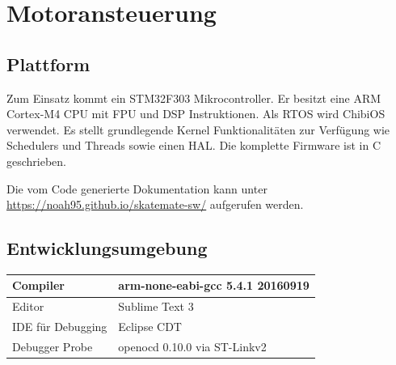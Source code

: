 \section{Motoransteuerung} \label{SW_Motoransteuerung}
\subsection*{Plattform}
Zum Einsatz kommt ein STM32F303 Mikrocontroller. Er besitzt eine ARM Cortex-M4 CPU mit FPU und DSP Instruktionen. Als RTOS wird ChibiOS verwendet. Es stellt grundlegende Kernel Funktionalitäten zur Verfügung wie Schedulers und Threads sowie einen HAL. Die komplette Firmware ist in C geschrieben.

Die vom Code generierte Dokumentation kann unter \url{https://noah95.github.io/skatemate-sw/} aufgerufen werden.
\subsection*{Entwicklungsumgebung}
\begin{center}
	\begin{tabular}{  l | l  }
		\hline
		Compiler & arm-none-eabi-gcc 5.4.1 20160919 \\ \hline
		Editor & Sublime Text 3 \\ \hline
		IDE für Debugging & Eclipse CDT \\ \hline
		Debugger Probe & openocd 0.10.0 via ST-Linkv2 \\ \hline
	\end{tabular}
\end{center}


